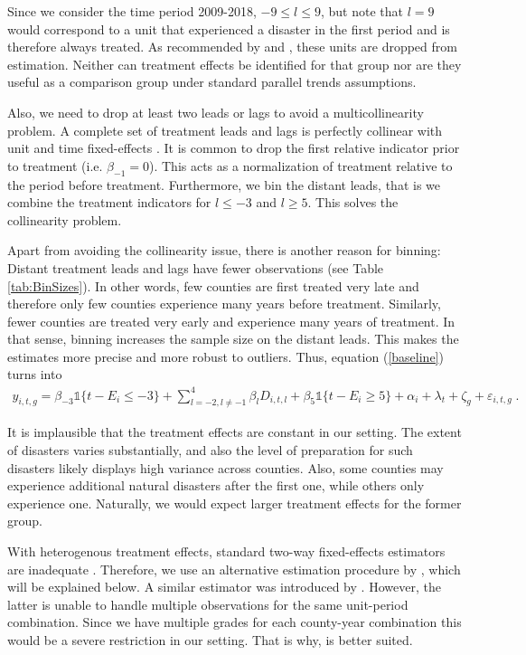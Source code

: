 Since we consider the time period 2009-2018, $-9 \leq l \leq 9$, but note that $l = 9$ would correspond to a unit that experienced a disaster in the first period and is therefore always treated. As recommended by \cite{Sun_2021} and \cite{Callaway_2021}, these units are dropped from estimation. Neither can treatment effects be identified for that group nor are they useful as a comparison group under standard parallel trends assumptions.

Also, we need to drop at least two leads or lags to avoid a multicollinearity problem. A complete set of treatment leads and lags is perfectly collinear with unit and time fixed-effects \citep[for an extensive discussion of this issue see][Section 3.2]{Borusyak_2021}. It is common to drop the first relative indicator prior to treatment (i.e. $\beta_{-1} = 0$). This acts as a normalization of treatment relative to the period before treatment. Furthermore, we bin the distant leads, that is we combine the treatment indicators for $l \leq -3$ and $l \geq 5$. This solves the collinearity problem.

Apart from avoiding the collinearity issue, there is another reason for binning: Distant treatment leads and lags have fewer observations (see Table \ref{tab:BinSizes}). In other words, few counties are first treated very late and therefore only few counties experience many years before treatment. Similarly, fewer counties are treated very early and experience many years of treatment. In that sense, binning increases the sample size on the distant leads. This makes the estimates more precise and more robust to outliers. Thus, equation (\ref{baseline}) turns into
\begin{align} \label{baselineBinned}
	y_{i, t, g} = \beta_{-3}  \mathds{1}\{t - E_i \leq -3\} + \sum_{l = -2, l \neq -1}^{4} \beta_l D_{i, t, l} + \beta_{5}  \mathds{1}\{t - E_i \geq 5\} + \alpha_i + \lambda_t + \zeta_g + \varepsilon_{i, t, g} \;.
\end{align}



It is implausible that the treatment effects are constant in our setting. The extent of disasters varies substantially, and also the level of preparation for such disasters likely displays high variance across counties. Also, some counties may experience additional natural disasters after the first one, while others only experience one. Naturally, we would expect larger treatment effects for the former group.

With heterogenous treatment effects, standard two-way fixed-effects estimators are inadequate \citep{deChaisemartin_2020, deChaisemartin_2022, Sun_2021}. Therefore, we use an alternative estimation procedure by \cite{Sun_2021}, which will be explained below. A similar estimator was introduced by \cite{Callaway_2021}. However, the latter is unable to handle multiple observations for the same unit-period combination. Since we have multiple grades for each county-year combination this would be a severe restriction in our setting. That is why, \cite{Sun_2021} is better suited.

